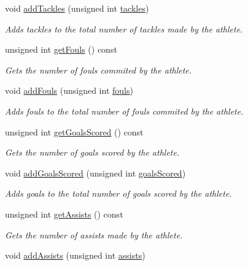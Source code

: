 \begin{DoxyCompactItemize}
void \hyperlink{class_info_a7d57f15ce5bf8b0b069d6f11c2238f36}{add\+Tackles} (unsigned int \hyperlink{class_info_aecdd57d96490b16a0c2590dd8f34009e}{tackles})
\begin{DoxyCompactList}\small\item\em Adds tackles to the total number of tackles made by the athlete. \end{DoxyCompactList}\item 
unsigned int \hyperlink{class_info_a94195f6bb305a247355f4038c18b3a67}{get\+Fouls} () const
\begin{DoxyCompactList}\small\item\em Gets the number of fouls commited by the athlete. \end{DoxyCompactList}\item 
void \hyperlink{class_info_aa4f58053aaff1dc1112f6c6396b64117}{add\+Fouls} (unsigned int \hyperlink{class_info_a2f90c84ba67c0e225dd58cdc14ab7f3d}{fouls})
\begin{DoxyCompactList}\small\item\em Adds fouls to the total number of fouls commited by the athlete. \end{DoxyCompactList}\item 
unsigned int \hyperlink{class_info_a2f29d691be81af12140d1bb88c9b7bad}{get\+Goals\+Scored} () const
\begin{DoxyCompactList}\small\item\em Gets the number of goals scored by the athlete. \end{DoxyCompactList}\item 
void \hyperlink{class_info_a19c376ed8c02c94f7836f1b61c0e1008}{add\+Goals\+Scored} (unsigned int \hyperlink{class_info_a5ad5f72833856502b9c1f6ea50a98619}{goals\+Scored})
\begin{DoxyCompactList}\small\item\em Adds goals to the total number of goals scored by the athlete. \end{DoxyCompactList}\item 
unsigned int \hyperlink{class_info_a38bd3c4f89a9b2f6d57ff7c3b7efa2ea}{get\+Assists} () const
\begin{DoxyCompactList}\small\item\em Gets the number of assists made by the athlete. \end{DoxyCompactList}\item 
void \hyperlink{class_info_accd8e297dc18e19d498376a2532c4862}{add\+Assists} (unsigned int \hyperlink{class_info_a1c0340af11df3407946b0ffdaae28864}{assists})

\end{DoxyCompactItemize}
